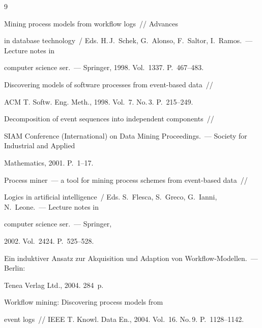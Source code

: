 {\small\frenchspacing

{%


\begin{thebibliography}{9}

  


 Mining process models from workflow logs~/\!\!/ Advances 

in database technology~/ Eds. H.\,J.~Schek, G.~Alonso, F.~Saltor, I.~Ramos.~--- Lecture notes in 

computer science ser.~--- Springer, 1998. Vol.~1337. P.~467--483.


 Discovering models of software processes from event-based data~/\!\!/ 

ACM T. Softw. Eng. Meth., 1998. Vol.~7. No.\,3. P.~215--249. 


 Decomposition of event sequences into independent components~/\!\!/ 

SIAM Conference (International) on Data Mining Proceedings.~--- Society for Industrial and Applied 

Mathematics, 2001. P.~1--17.


 Process miner~--- a tool for mining process schemes from event-based data~/\!\!/

Logics in artificial intelligence~/ Eds. S.~Flesca, S.~Greco, G.~Ianni, N.~Leone.~--- Lecture notes in 

computer science ser.~--- Springer,

 2002. Vol.~2424.  P.~525--528.


 Ein induktiver Ansatz zur Akquisition und Adaption von Workflow-Modellen.~--- Berlin: 

Tenea Verlag Ltd., 2004. 284~p.


 Workflow mining: Discovering process models from 

event logs~/\!\!/ IEEE T. Knowl.  Data En., 2004. Vol.~16. No.\,9. P.~1128--1142. 




\end{thebibliography}}}
